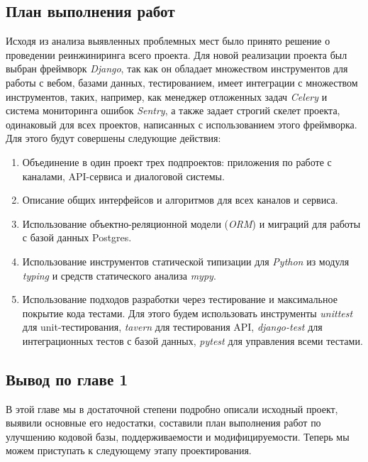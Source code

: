     \subsection{План выполнения работ}
    Исходя из анализа выявленных проблемных мест было принято решение о проведении реинжиниринга всего проекта.
    Для новой реализации проекта был выбран фреймворк \textit{Django}\cite{docs.django}, так как он обладает множеством инструментов
    для работы с вебом, базами данных, тестированием, имеет интеграции с множеством инструментов, таких, например,
    как менеджер отложенных задач \textit{Celery}\cite{docs.celery} и система мониторинга ошибок \textit{Sentry},
    а также задает строгий скелет проекта, одинаковый для всех проектов, написанных с использованием этого фреймворка.
    Для этого будут совершены следующие действия:
    \begin{enumerate}
        \item Объединение в один проект трех подпроектов: приложения по работе с каналами, API-сервиса и диалоговой системы.
        \item Описание общих интерфейсов и алгоритмов для всех каналов и сервиса.
        \item Использование объектно-реляционной модели (\textit{ORM}) и миграций для работы с базой данных
        Postgres\cite{postgres.stepic}.
        \item Использование инструментов статической типизации для \textit{Python} из модуля \textit{typing}
        и средств статического анализа \textit{mypy}\cite{docs.python}.
        \item Использование подходов разработки через тестирование и максимальное покрытие кода тестами. Для этого
        будем использовать инструменты \textit{unittest}\cite{docs.python} для unit-тестирования, \textit{tavern} для тестирования API,
        \textit{django-test} для интеграционных тестов с базой данных, \textit{pytest} для управления всеми тестами.
    \end{enumerate}

    \subsection*{Вывод по главе 1}
    В этой главе мы в достаточной степени подробно описали исходный проект, выявили основные его
    недостатки, составили план выполнения работ по улучшению кодовой базы, поддерживаемости и модифицируемости.
    Теперь мы можем приступать к следующему этапу проектирования.
